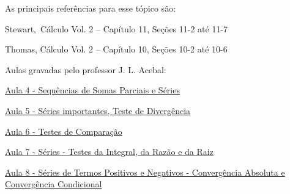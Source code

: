 As principais referências para esse tópico são:
\begin{listrefs}
  \item Stewart,\, Cálculo Vol. 2 \cite{stewart_2} -- Capítulo 11, Seções 11-2 até 11-7
  \item Thomas,    Cálculo Vol. 2 \cite{thomas_2}  -- Capítulo 10, Seções 10-2 até 10-6
\end{listrefs}

Aulas gravadas pelo professor J. L. Acebal:
\begin{listlinks}
  \item \href{https://youtu.be/-JzlrLOZrGc}{Aula 4 - Sequências de Somas Parciais e Séries}
  \item \href{https://youtu.be/DAer_v9z9cs}{Aula 5 - Séries importantes, Teste de Divergência}
  \item \href{https://youtu.be/Esl6Ot0Ewe8}{Aula 6 - Testes de Comparação}
  \item \href{https://youtu.be/bqM1tT5U3n4}{Aula 7 - Séries - Testes da Integral, da Razão e da Raiz}
  \item \href{https://youtu.be/4KRHu_4eiMc}{Aula 8 - Séries de Termos Positivos e Negativos - Convergência Absoluta e Convergência Condicional}
\end{listlinks}

